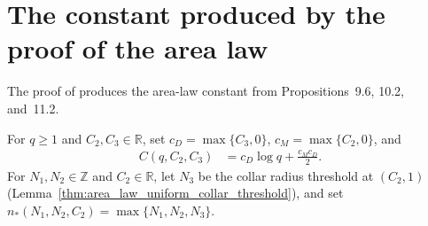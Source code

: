 \section{The constant produced by the proof of the area law}
\label{sec:area_law_explicit_constant}

The proof of \cite[Theorem~1.1]{OpenAI2026AreaLaw} produces the area-law constant from Propositions~9.6, 10.2, and~11.2.


\begin{definition}
    \label{def:area_law_proof_constant}
    \leanok
    For $q\ge1$ and $C_2,C_3\in\mathbb R$, set $c_D=\max\{C_3,0\}$,
    $c_M=\max\{C_2,0\}$, and
    \begin{align}
        C(q,C_2,C_3) & =c_D\log q+\frac{c_Mc_D}{2}.
        \label{eq:area_law_proof_constant}
    \end{align}
    For $N_1,N_2\in\mathbb Z$ and $C_2\in\mathbb R$, let $N_3$ be the collar
    radius threshold at $(C_2,1)$ (Lemma~\ref{thm:area_law_uniform_collar_threshold}), and set
    $n_*(N_1,N_2,C_2)=\max\{N_1,N_2,N_3\}$.
\end{definition}

